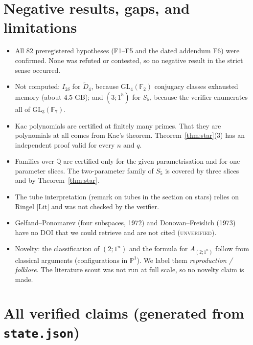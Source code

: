 \documentclass[11pt]{article}
\theoremstyle{definition}\newtheorem{definition}[theorem]{Definition}\newtheorem{remark}[theorem]{Remark}\newtheorem{observation}[theorem]{Numerical observation}
\begin{document}
\section{Negative results, gaps, and limitations}
\begin{itemize}
\item All $82$ preregistered hypotheses (F1--F5 and the dated addendum F6) were confirmed. None was refuted or contested, so no negative result in the strict sense occurred.
\item Not computed: $I_{2\delta}$ for $\widetilde D_4$, because $\mathrm{GL}_4(\mathbb F_2)$ conjugacy classes exhausted memory (about $4.5$ GB); and $(3;1^5)$ for $S_5$, because the verifier enumerates
all of $\mathrm{GL}_3(\mathbb F_7)$.
\item Kac polynomials are certified at finitely many primes. That they are polynomials at all comes from Kac's theorem. Theorem~\ref{thm:star}(3) has an
independent proof valid for every $n$ and $q$.
\item Families over $\overline{\mathbb Q}$ are certified only for the given parametrisation and for one-parameter slices. The two-parameter family of $S_5$ is covered by three slices
and by Theorem~\ref{thm:star}.
\item The tube interpretation (remark on tubes in the section on stars) relies on Ringel [Lit] and was not checked by the verifier.
\item Gelfand--Ponomarev (four subspaces, 1972) and Donovan--Freislich (1973) have no DOI that we could retrieve and are not cited (\textsc{unverified}).
\item Novelty: the classification of $(2;1^n)$ and the formula for $A_{(2;1^n)}$ follow from classical arguments (configurations in $\mathbb P^1$).
We label them \emph{reproduction / folklore}. The literature scout was not run at full scale, so no novelty claim is made.
\end{itemize}

\appendix
\section{All verified claims (generated from \texttt{state.json})}
\end{document}
